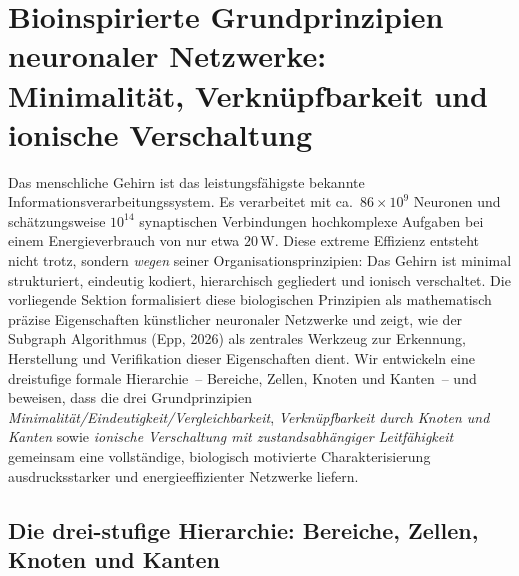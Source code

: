 \documentclass[12pt, a4paper, openany]{report}
\begin{document}
\chapter{Bioinspirierte Grundprinzipien neuronaler Netzwerke: Minimalität, Verknüpfbarkeit und ionische Verschaltung}
\label{sec:bioprinciples}

Das menschliche Gehirn ist das leistungsfähigste bekannte Informationsverarbeitungssystem.
Es verarbeitet mit ca.\ $86 \times 10^9$ Neuronen und schätzungsweise $10^{14}$
synaptischen Verbindungen hochkomplexe Aufgaben bei einem Energieverbrauch von
nur etwa $20\,\mathrm{W}$.  Diese extreme Effizienz entsteht nicht trotz,
sondern \emph{wegen} seiner Organisationsprinzipien: Das Gehirn ist minimal
strukturiert, eindeutig kodiert, hierarchisch gegliedert und ionisch
verschaltet.  Die vorliegende Sektion formalisiert diese biologischen
Prinzipien als mathematisch präzise Eigenschaften künstlicher neuronaler
Netzwerke und zeigt, wie der Subgraph Algorithmus (Epp, 2026) als zentrales
Werkzeug zur Erkennung, Herstellung und Verifikation dieser Eigenschaften
dient.  Wir entwickeln eine dreistufige formale Hierarchie~-- Bereiche,
Zellen, Knoten und Kanten~-- und beweisen, dass die drei Grundprinzipien
\emph{Minimalität/Eindeutigkeit/Vergleichbarkeit},
\emph{Verknüpfbarkeit durch Knoten und Kanten} sowie
\emph{ionische Verschaltung mit zustandsabhängiger Leitfähigkeit}
gemeinsam eine vollständige, biologisch motivierte Charakterisierung
ausdrucksstarker und energieeffizienter Netzwerke liefern.

\section{Die drei-stufige Hierarchie: Bereiche, Zellen, Knoten und Kanten}
\label{sec:bio_hierarchy}
\end{document}

